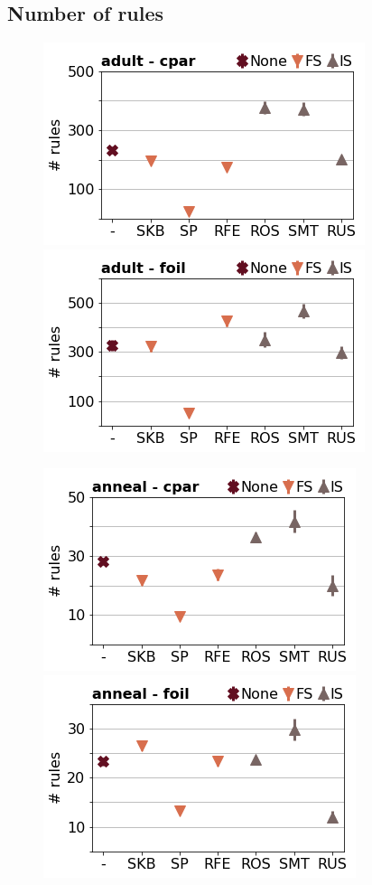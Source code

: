 \documentclass[runningheads,a4paper]{llncs}
\begin{document}
\clearpage
\subsection{Number of rules}

\begin{figure}[!h]
\includegraphics[width=0.32\linewidth]{fig/preps_adult_RB_cpar_nbr_rules.png}
\includegraphics[width=0.32\linewidth]{fig/preps_adult_RB_foil_nbr_rules.png}
\end{figure}

\begin{figure}[!h]
\includegraphics[width=0.32\linewidth]{fig/preps_anneal_RB_cpar_nbr_rules.png}
\includegraphics[width=0.32\linewidth]{fig/preps_anneal_RB_foil_nbr_rules.png}
\end{figure}
\end{document}
